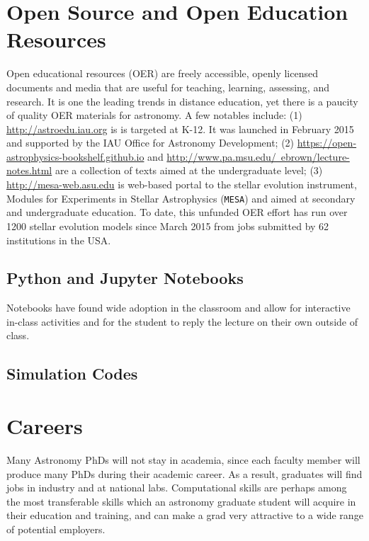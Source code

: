 \documentclass[11pt]{article}
\begin{document}
\section{Open Source and Open Education Resources}
Open educational resources (OER) are freely accessible, openly
licensed documents and media that are useful for teaching, learning,
assessing, and research. It is one the leading trends in distance education,
yet there is a paucity of quality OER materials for astronomy. A few notables
include:
(1) \href{http://astroedu.iau.org}{http://astroedu.iau.org} is 
is targeted at K-12. It was launched in February 2015 and 
supported by the IAU Office for Astronomy Development;
(2) \href{https://open-astrophysics-bookshelf.github.io}{https://open-astrophysics-bookshelf.github.io}
and \href{http://www.pa.msu.edu/~ebrown/lecture-notes.html}{http://www.pa.msu.edu/~ebrown/lecture-notes.html}
are a collection of texts aimed at the undergraduate level; 
(3) \href{http://mesa-web.asu.edu}{http://mesa-web.asu.edu} 
is web-based portal to the stellar evolution instrument, Modules for
Experiments in Stellar Astrophysics ({\tt MESA}) and aimed at 
secondary and undergraduate education. To date, this unfunded OER effort has
run over 1200 stellar evolution models since March 2015 from jobs submitted
by 62 institutions in the USA.



\subsection{Python and Jupyter Notebooks}

Notebooks have found wide adoption in the classroom and allow for
interactive in-class activities and for the student to reply the
lecture on their own outside of class.

\subsection{Simulation Codes}




\section{Careers}

Many Astronomy PhDs will not stay in academia, since each faculty member
will produce many PhDs during their academic career.  As a result, graduates
will find jobs in industry and at national labs. Computational skills are perhaps
among the most transferable skills which an astronomy graduate student will acquire
in their education and training, and
can make a grad very attractive to a wide range of potential employers.
\end{document}
